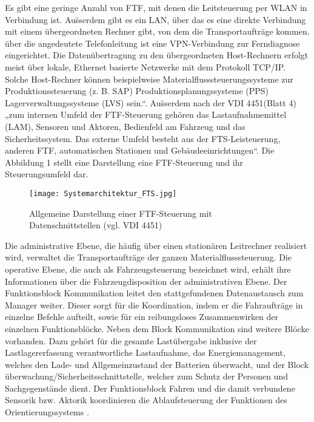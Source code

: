 Es gibt eine geringe Anzahl von FTF, mit denen die Leitsteuerung per WLAN in Verbindung ist. Au\"sserdem gibt es ein LAN, \"uber das es eine direkte Verbindung mit einem \"ubergeordneten Rechner gibt, von dem die Transportauftr\"age kommen. \"uber die angedeutete Telefonleitung ist eine VPN-Verbindung zur Ferndiagnose eingerichtet. Die Daten\"ubertragung zu den \"ubergeordneten Host-Rechnern erfolgt meist \"uber lokale, Ethernet basierte Netzwerke mit dem Protokoll TCP/IP. Solche Host-Rechner k\"onnen beispielweise Materialflusssteuerungssysteme zur Produktionssteuerung (z. B. SAP) Produktionsplanungssysteme (PPS) Lagerverwaltungssysteme (LVS) sein.“\cite[S. 13]{Guenther:2011}. 
Au\"sserdem nach der VDI 4451(Blatt 4) „zum internen Umfeld der FTF-Steuerung geh\"oren das Lastaufnahmemittel (LAM), Sensoren und Aktoren, Bedienfeld am Fahrzeug und das Sicherheitssystem. Das externe Umfeld besteht aus der FTS-Leisteuerung, anderen FTF, automatischen Stationen und Geb\"audeeinrichtungen“. Die Abbildung 1 stellt eine Darstellung eine FTF-Steuerung und ihr Steuerungsumfeld dar.
	\begin{figure}[h!]
		\centering
		\texttt{[image: Systemarchitektur\_FTS.jpg]}
		\caption{Allgemeine Darstellung einer FTF-Steuerung mit Datenschnittstellen (vgl. VDI 4451)}
		\label{Wertschoepfungskette}
	\end{figure}
Die administrative Ebene, die h\"aufig \"uber einen station\"aren Leitrechner realisiert wird, verwaltet die Transportauftr\"age der ganzen Materialflusssteuerung. Die operative Ebene, die auch als Fahrzeugsteuerung bezeichnet wird, erh\"alt ihre Informationen \"uber die Fahrzeugdisposition der administrativen Ebene. Der Funktionsblock Kommunikation leitet den stattgefundenen Datenaustausch zum Manager weiter. Dieser sorgt f\"ur die Koordination, indem er die Fahrauftr\"age in einzelne Befehle aufteilt, sowie f\"ur ein reibungsloses Zusammenwirken der einzelnen Funktionsbl\"ocke. Neben dem Block Kommunikation sind weitere Bl\"ocke vorhanden. Dazu geh\"ort f\"ur die gesamte Last\"ubergabe inklusive der Lastlagererfassung verantwortliche Lastaufnahme, das Energiemanagement, welches den Lade- und Allgemeinzustand der Batterien \"uberwacht, und der Block \"uberwachung/Sicherheitsschnittstelle, welcher zum Schutz der Personen und Sachgegenst\"ande dient. Der Funktionsblock Fahren und die damit verbundene Sensorik bzw. Aktorik koordinieren die Ablaufsteuerung der Funktionen des Orientierungssystems \cite[S. 33]{Langenbach:2012}.


